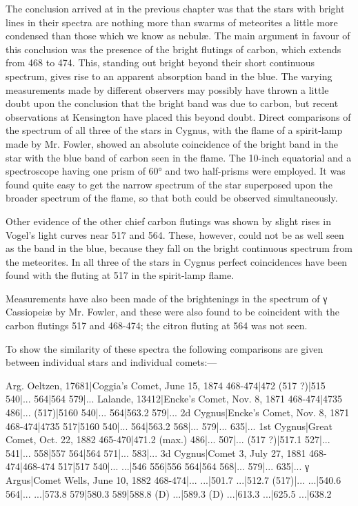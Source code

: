 \documentclass[a4paper, 12pt, oneside, polutonikogreek, english]{article}
\begin{document}
The conclusion arrived at in the previous chapter was that the stars with bright lines in their spectra are nothing more than swarms of meteorites a little more condensed than those which we know as nebulæ. The main argument in favour of this conclusion was the presence of the bright flutings of carbon, which extends from 468 to 474. This, standing out bright beyond their short continuous spectrum, gives rise to an apparent absorption band in the blue. The varying measurements made by different observers may possibly have thrown a little doubt upon the conclusion that the bright band was due to carbon, but recent observations at Kensington have placed this beyond doubt. Direct comparisons of the spectrum of all three of the stars in Cygnus, with the flame of a spirit-lamp made by Mr. Fowler, showed an absolute coincidence of the bright band in the star with the blue band of carbon seen in the flame. The 10-inch equatorial and a spectroscope having one prism of 60° and two half-prisms were employed. It was found quite easy to get the narrow spectrum of the star superposed upon the broader spectrum of the flame, so that both could be observed simultaneously.

Other evidence of the other chief carbon flutings was shown by slight rises in Vogel's light curves near 517 and 564. These, however, could not be as well seen as the band in the blue, because they fall on the bright continuous spectrum from the meteorites. In all three of the stars in Cygnus perfect coincidences have been found with the fluting at 517 in the spirit-lamp flame.

Measurements have also been made of the brightenings in the spectrum of γ Cassiopeiæ by Mr. Fowler, and these were also found to be coincident with the carbon flutings 517 and 468-474; the citron fluting at 564 was not seen.

To show the similarity of these spectra the following comparisons are given between individual stars and individual comets:---

Arg. Oeltzen, 17681|Coggia's Comet, June 15, 1874 
468-474|472 
(517 ?)|515 
540|... 
564|564 
579|... 
Lalande, 13412|Encke's Comet, Nov. 8, 1871 
468-474|4735 
486|... 
(517)|5160 
540|... 
564|563.2 
579|... 
2d Cygnus|Encke's Comet, Nov. 8, 1871 
468-474|4735 
517|5160 
540|... 
564|563.2 
568|... 
579|... 
635|... 
1st Cygnus|Great Comet, Oct. 22, 1882 
465-470|471.2 (max.) 
486|... 
507|... 
(517 ?)|517.1 
527|... 
541|... 
558|557 
564|564 
571|... 
583|... 
3d Cygnus|Comet 3, July 27, 1881 
468-474|468-474 
517|517 
540|... 
...|546 
556|556 
564|564 
568|... 
579|... 
635|... 
γ Argus|Comet Wells, June 10, 1882 
468-474|... 
...|501.7 
...|512.7 
(517)|... 
...|540.6 
564|... 
...|573.8 
579|580.3 
589|588.8 (D) 
...|589.3 (D) 
...|613.3 
...|625.5 
...|638.2 
\end{document}
